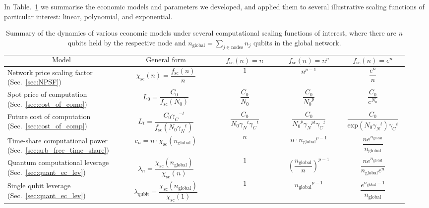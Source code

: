In Table.~\ref{tab:summary_ec_models} we summarise the economic models and parameters we developed, and applied them to several illustrative scaling functions of particular interest: linear, polynomial, and exponential. 

\renewcommand{\tablename}{TABLE}
\renewcommand{\arraystretch}{0.5}

\begin{table}[!htb]
\caption{Summary of the dynamics of various economic models under several computational scaling functions of interest, where there are $n$ qubits held by the respective node and \mbox{$n_\text{global}=\sum_{j\in \text{nodes}} n_j$} qubits in the global network.} \label{tab:summary_ec_models}
\begin{tabular}{|p{0.255\linewidth}|p{0.22\linewidth}|p{0.155\linewidth}|p{0.155\linewidth}|p{0.155\linewidth}|}
	\hline
	\[\text{Model}\] & \[\text{General form}\] & \[f_\text{sc}(n)=n^{}\] & \[f_\text{sc}(n)=n^p\] & \[f_\text{sc}(n)=e^n\]\\
	\hline \hline
	Network price scaling factor (Sec.~\ref{sec:NPSF}) & \[\chi_\text{sc}(n)=\frac{f_\text{sc}(n)}{n}\] & \[1\] & \[n^{p-1}\] & \[\frac{e^n}{n}\]\\
	\hline
	Spot price of computation (Sec.~\ref{sec:cost_of_comp}) & \[L_0=\frac{C_0}{f_\text{sc}(N_0)}\] & \[\frac{C_0}{N_0}\] & \[\frac{C_0}{{N_0}^p}\] & \[\frac{C_0}{e^{N_0}}\]\\
	\hline
	Future cost of computation (Sec.~\ref{sec:cost_of_comp}) & \[L_t=\frac{C_0 {\gamma_C}^{-t}}{f_\text{sc}(N_0 {\gamma_N}^t)}
\] & \[\frac{C_0}{N_0{\gamma_N}^{t}{\gamma_C}^{t}}\] & \[\frac{C_0}{{N_0}^p{\gamma_N}^{pt}{\gamma_C}^t}\] & \[\frac{C_0}{\text{exp}(N_0{\gamma_N}^t){\gamma_C}^t}\]\\
	\hline
	Time-share computational power (Sec.~\ref{sec:arb_free_time_share}) & \[c_n=n \cdot \chi_\text{sc}(n_\text{global})
\] & \[n\] & \[n\cdot{n_\text{global}}^{p-1}\] & \[\frac{n e^{n_\text{global}}}{n_\text{global}}\]\\
	\hline
	Quantum computational leverage (Sec.~\ref{sec:quant_ec_lev}) & \[\lambda_n=\frac{\chi_\text{sc}(n_\text{global})}{\chi_\text{sc}(n)}\] & \[1\] & \[\left(\frac{n_\text{global}}{n}\right)^{p-1}\] & \[\frac{n e^{n_\text{global}}}{n_\text{global}e^n}\]\\
	\hline
	Single qubit leverage (Sec.~\ref{sec:quant_ec_lev}) & \[\lambda_\text{qubit}=\frac{\chi_\text{sc}(n_\text{global})}{\chi_\text{sc}(1)}\] & \[1\] & \[{n_\text{global}}^{p-1}\] & \[\frac{e^{n_\text{global}-1}}{n_\text{global}}\]\\

\end{tabular}
\end{table}

